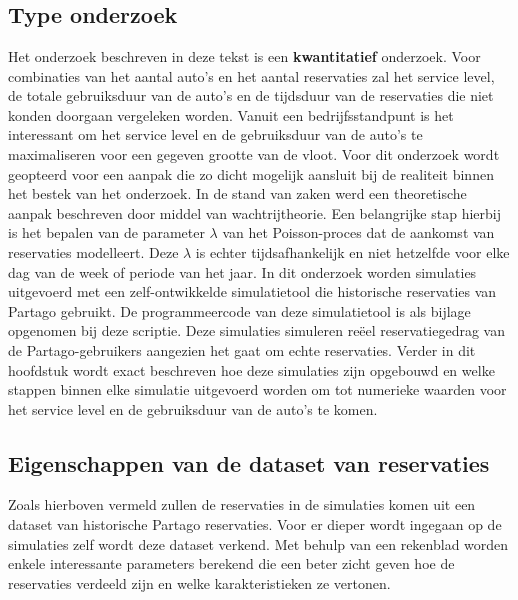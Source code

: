 
\chapter{}
\label{ch:methodologie}

\section{Type onderzoek}
Het onderzoek beschreven in deze tekst is een \textbf{kwantitatief} onderzoek. Voor combinaties van het aantal auto's en het aantal reservaties zal het service level, de totale gebruiksduur van de auto's en de tijdsduur van de reservaties die niet konden doorgaan vergeleken worden. Vanuit een bedrijfsstandpunt is het interessant om het service level en de gebruiksduur van de auto's te maximaliseren voor een gegeven grootte van de vloot. Voor dit onderzoek wordt geopteerd voor een aanpak die zo dicht mogelijk aansluit bij de realiteit binnen het bestek van het onderzoek. In de stand van zaken werd een theoretische aanpak beschreven door middel van wachtrijtheorie. Een belangrijke stap hierbij is het bepalen van de parameter $\lambda$ van het Poisson-proces dat de aankomst van reservaties modelleert. Deze $\lambda$ is echter tijdsafhankelijk en niet hetzelfde voor elke dag van de week of periode van het jaar. In dit onderzoek worden simulaties uitgevoerd met een zelf-ontwikkelde simulatietool die historische reservaties van Partago gebruikt. De programmeercode van deze simulatietool is als bijlage opgenomen bij deze scriptie. Deze simulaties simuleren reëel reservatiegedrag van de Partago-gebruikers aangezien het gaat om echte reservaties. Verder in dit hoofdstuk wordt exact beschreven hoe deze simulaties zijn opgebouwd en welke stappen binnen elke simulatie uitgevoerd worden om tot numerieke waarden voor het service level en de gebruiksduur van de auto's te komen. 

\section{Eigenschappen van de dataset van reservaties} \label{eigenschappen-dataset}
Zoals hierboven vermeld zullen de reservaties in de simulaties komen uit een dataset van historische Partago reservaties. Voor er dieper wordt ingegaan op de simulaties zelf wordt deze dataset verkend. Met behulp van een rekenblad worden enkele interessante parameters berekend die een beter zicht geven hoe de reservaties verdeeld zijn en welke karakteristieken ze vertonen. 
